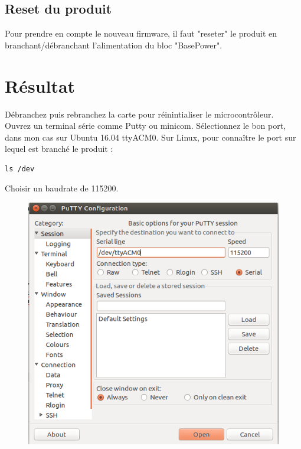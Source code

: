 \documentclass{article}
\begin{document}
\subsection{Reset du produit}
Pour prendre en compte le nouveau firmware, il faut "reseter" le produit en branchant/débranchant l'alimentation du bloc "BasePower".


\section{Résultat}

Débranchez puis rebranchez la carte pour réinintialiser le microcontrôleur.\\
Ouvrez un terminal série comme Putty ou minicom.
Sélectionnez le bon port, dans mon cas sur Ubuntu 16.04 ttyACM0.
Sur Linux, pour connaître le port sur lequel est branché le produit :

\begin{verbatim}
ls /dev

\end{verbatim}

Choisir un baudrate de 115200.


\begin{figure}[H]
\begin{center}
\advance\leftskip-3cm
\advance\rightskip-3cm
\includegraphics[keepaspectratio=true,scale=0.5]{putty.png}

\label{visina8}
\end{center}\end{figure}
\end{document}
